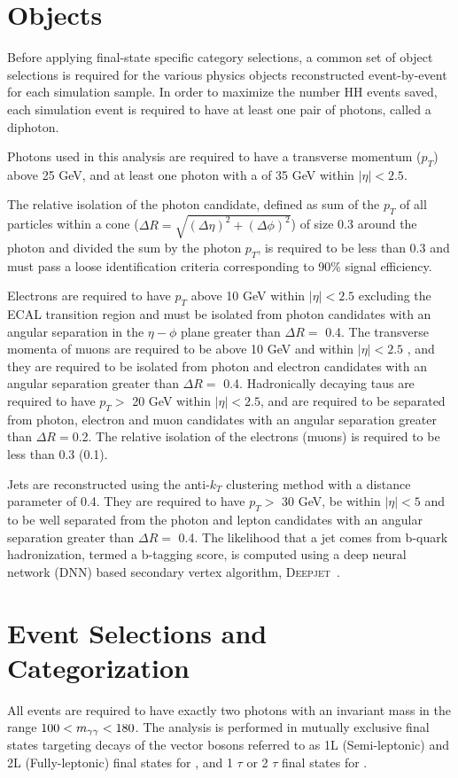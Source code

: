 \section{Objects}
\label{sec:Phase_II_ObjectSel}

Before applying final-state specific category selections, a common set of object selections is required for the various physics objects reconstructed event-by-event for each simulation sample. In order to maximize the number HH events saved, each simulation event is required to have at least one pair of photons, called a diphoton.

Photons used in this analysis are required to have a transverse momentum ($p_T$) above 25 GeV, and at least one photon with a \pt of 35 GeV
within $|\eta| < 2.5$.

The relative isolation of the photon
candidate, defined as sum of the $p_T$ of all particles within a cone ($\Delta R = \sqrt{(\Delta \eta)^2 + (\Delta \phi)^2}$) of size 0.3 around the photon and divided the sum by the photon $p_T$, 
is required to be less than 0.3 and must pass a loose identification criteria corresponding to 90\% signal efficiency.

Electrons are required to have $p_T$ above 10 GeV within $|\eta| < 2.5$ excluding the ECAL transition region and 
must be isolated from photon candidates with an angular separation in the $\eta-\phi$ plane greater than $\Delta R = $ 0.4. 
The transverse momenta of muons are required to be above 10 GeV and within $|\eta| < 2.5$ 
, and they are required to be isolated from photon and electron candidates with an angular separation greater than $\Delta R = $ 0.4. 
Hadronically decaying taus are required to have $p_T >$ 20 GeV within $|\eta| < 2.5$, and are required to be separated from photon, electron and muon candidates  
with an angular separation greater than $\Delta R = $0.2. The relative isolation of the electrons (muons) is required to be less than 0.3 (0.1).

Jets are reconstructed using the anti-$k_{T}$ clustering method with a distance parameter of 0.4. 
They are required to have $p_T >$ 30 GeV, be within $|\eta| < 5$ and to be well separated from the photon and lepton candidates with an angular separation greater than $\Delta R = $ 0.4. The likelihood that a jet comes from b-quark hadronization, termed a b-tagging score, is computed using a deep neural network (DNN) based secondary vertex algorithm, \textsc{Deepjet}~\cite{CMS-DP-2018-058, Bols:2020bkb}. 

\section{Event Selections and Categorization}
\label{sec:Phase_II_Selections}  
All events are required to have exactly two photons with an invariant mass in the range $100 < m_{\gamma\gamma} < 180$\GeV. The analysis is performed in mutually exclusive final states targeting decays of the vector bosons referred to as 1L (Semi-leptonic) and 2L (Fully-leptonic) final states for \wwgg, and 1 $\tau$ or 2 $\tau$ final states for \ttgg. 

